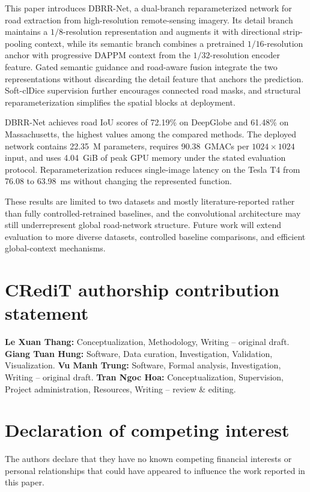 \documentclass[a4paper,fleqn, review]{cas-sc}
\begin{document}
This paper introduces DBRR-Net, a dual-branch reparameterized network for road
extraction from high-resolution remote-sensing imagery. Its detail branch
maintains a $1/8$-resolution representation and augments it with directional
strip-pooling context, while its semantic branch combines a pretrained
$1/16$-resolution anchor with progressive DAPPM context from the
$1/32$-resolution encoder feature. Gated semantic guidance and road-aware
fusion integrate the two representations without discarding the detail feature
that anchors the prediction. Soft-clDice supervision further encourages
connected road masks, and structural reparameterization simplifies the spatial
blocks at deployment.

DBRR-Net achieves road IoU scores of 72.19\% on DeepGlobe and 61.48\% on
Massachusetts, the highest values among the compared methods. The deployed
network contains 22.35~M parameters, requires 90.38~GMACs per
$1024\times1024$ input, and uses 4.04~GiB of peak GPU memory under the stated
evaluation protocol. Reparameterization reduces single-image latency on the
Tesla T4 from 76.08 to 63.98~ms without changing the represented function.

These results are limited to two datasets and mostly literature-reported
rather than fully controlled-retrained baselines, and the convolutional
architecture may still underrepresent global road-network structure. Future
work will extend evaluation to more diverse datasets, controlled baseline
comparisons, and efficient global-context mechanisms.

\section*{CRediT authorship contribution statement}
\textbf{Le Xuan Thang:} Conceptualization, Methodology, Writing -- original
draft. \textbf{Giang Tuan Hung:} Software, Data curation, Investigation,
Validation, Visualization. \textbf{Vu Manh Trung:} Software, Formal analysis,
Investigation, Writing -- original draft. \textbf{Tran Ngoc Hoa:}
Conceptualization, Supervision, Project administration, Resources, Writing --
review \& editing.

\section*{Declaration of competing interest}
The authors declare that they have no known competing financial interests or
personal relationships that could have appeared to influence the work reported in
this paper.
\end{document}
